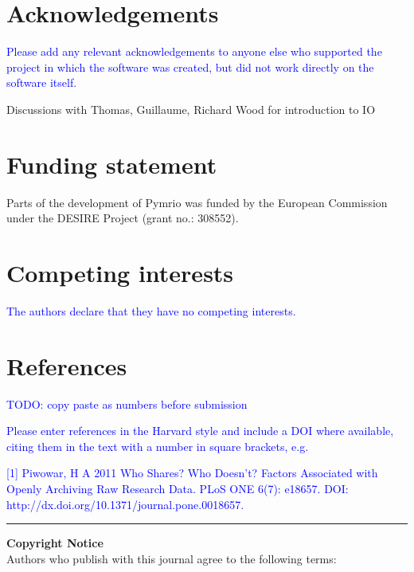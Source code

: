 \documentclass{jors}
\begin{document}
\section*{Acknowledgements}

\textcolor{blue}{Please add any relevant acknowledgements to anyone else who supported the project in which the software was created, but did not work directly on the software itself.}

Discussions with Thomas, Guillaume, Richard Wood for introduction to IO

\section*{Funding statement}

Parts of the development of Pymrio was funded by the European Commission under the DESIRE Project (grant no.: 308552).

\section*{Competing interests}

\textcolor{blue}{The authors declare that they have no competing interests.}

\section*{References}

\textcolor{blue}{TODO: copy paste as numbers before submission}



\textcolor{blue}{Please enter references in the Harvard style and include a DOI where available, citing them in the text with a number in square brackets, e.g. \\ }

\textcolor{blue}{[1] Piwowar, H A 2011 Who Shares? Who Doesn't? Factors Associated with Openly Archiving Raw Research Data. PLoS ONE 6(7): e18657. DOI: \\ http://dx.doi.org/10.1371/journal.pone.0018657.}

\vspace{2cm}

\rule{\textwidth}{1pt}

{ \bf Copyright Notice} \\
Authors who publish with this journal agree to the following terms: \\
\end{document}
